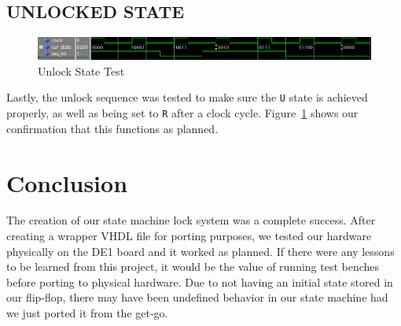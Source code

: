 \documentclass[paper=a4, fontsize=11pt,twoside]{scrartcl}
\begin{document}

	\subsection{UNLOCKED STATE} %
	\label{sub:unlocked_state}
	\begin{figure}[th]
		\centering
		\includegraphics[scale=0.5]{UNLOCK.png}
		\caption{Unlock State Test}
		\label{fig:unlock}
	\end{figure}
	Lastly, the unlock sequence was tested to make sure the \texttt{U} state is achieved properly, as well as being set to \texttt{R} after a clock cycle. Figure~\ref{fig:unlock} shows our confirmation that this functions as planned.

\section{Conclusion} %
\label{sec:conclusion}
The creation of our state machine lock system was a complete success. After creating a wrapper VHDL file for porting purposes, we tested our hardware physically on the DE1 board and it worked as planned. If there were any lessons to be learned from this project, it would be the value of running test benches before porting to physical hardware. Due to not having an initial state stored in our flip-flop, there may have been undefined behavior in our state machine had we just ported it from the get-go.






\end{document}

